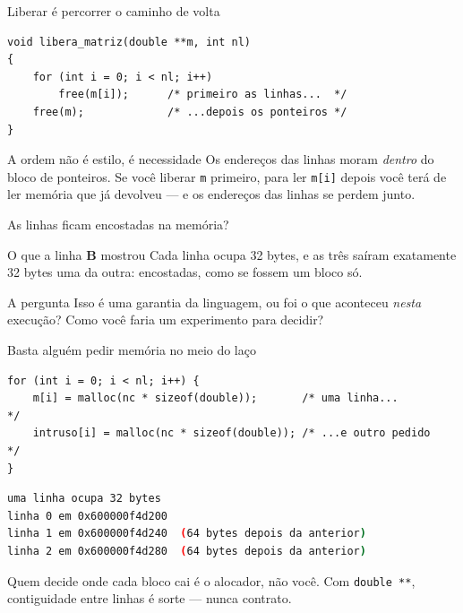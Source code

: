 \documentclass[aspectratio=169]{beamer}
\begin{document}
\begin{frame}[fragile]{Liberar é percorrer o caminho de volta}
\begin{lstlisting}[basicstyle=\ttfamily\scriptsize, numbers=none]
void libera_matriz(double **m, int nl)
{
    for (int i = 0; i < nl; i++)
        free(m[i]);      /* primeiro as linhas...  */
    free(m);             /* ...depois os ponteiros */
}
\end{lstlisting}
  \begin{block}{A ordem não é estilo, é necessidade}
    Os endereços das linhas moram \emph{dentro} do bloco de ponteiros. Se você
    liberar \texttt{m} primeiro, para ler \texttt{m[i]} depois você terá de ler
    memória que já devolveu --- e os endereços das linhas se perdem junto.
  \end{block}
\end{frame}

\begin{frame}{As linhas ficam encostadas na memória?}
  \begin{block}{O que a linha \textbf{B} mostrou}
    Cada linha ocupa 32 bytes, e as três saíram exatamente 32 bytes uma da
    outra: encostadas, como se fossem um bloco só.
  \end{block}
  \begin{exampleblock}{A pergunta}
    Isso é uma garantia da linguagem, ou foi o que aconteceu \emph{nesta}
    execução? Como você faria um experimento para decidir?
  \end{exampleblock}
\end{frame}

\begin{frame}[fragile]{Basta alguém pedir memória no meio do laço}
\begin{lstlisting}[basicstyle=\ttfamily\scriptsize, numbers=none]
for (int i = 0; i < nl; i++) {
    m[i] = malloc(nc * sizeof(double));       /* uma linha...        */
    intruso[i] = malloc(nc * sizeof(double)); /* ...e outro pedido   */
}
\end{lstlisting}
\begin{lstlisting}[basicstyle=\ttfamily\scriptsize, numbers=none, language=bash]
uma linha ocupa 32 bytes
linha 0 em 0x600000f4d200
linha 1 em 0x600000f4d240  (64 bytes depois da anterior)
linha 2 em 0x600000f4d280  (64 bytes depois da anterior)
\end{lstlisting}
  \begin{block}{}
    \small Quem decide onde cada bloco cai é o alocador, não você. Com
    \texttt{double **}, contiguidade entre linhas é sorte --- nunca contrato.
  \end{block}
\end{frame}
\end{document}
